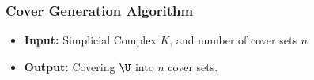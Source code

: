 	
\begin{frame}
\frametitle{Cover Generation Algorithm}
\begin{itemize}
\item \textbf{Input: } Simplicial Complex $K$, and number of cover sets $n$
\item \textbf{Output:} Covering $\U$ into $n$ cover sets.
\end{itemize}
\begin{figure}
\def\svgwidth{.55\textwidth} 






\end{figure}
\end{frame}

